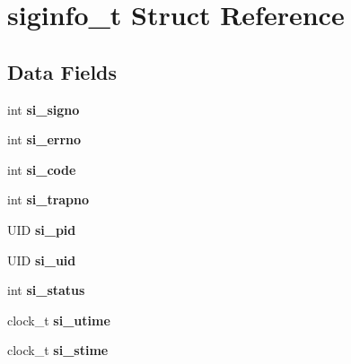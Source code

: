 \hypertarget{structsiginfo__t}{}\section{siginfo\+\_\+t Struct Reference}
\label{structsiginfo__t}
\subsection*{Data Fields}
\begin{DoxyCompactItemize}
\item 
int {\bfseries si\+\_\+signo}\hypertarget{structsiginfo__t_a238821f6eb15317d3d7b10efef80b9c7}{}\label{structsiginfo__t_a238821f6eb15317d3d7b10efef80b9c7}

\item 
int {\bfseries si\+\_\+errno}\hypertarget{structsiginfo__t_ae840a8f2824bab1693577f19f4d0432d}{}\label{structsiginfo__t_ae840a8f2824bab1693577f19f4d0432d}

\item 
int {\bfseries si\+\_\+code}\hypertarget{structsiginfo__t_a0dd36ae3e9df589f5755f88c93671c2d}{}\label{structsiginfo__t_a0dd36ae3e9df589f5755f88c93671c2d}

\item 
int {\bfseries si\+\_\+trapno}\hypertarget{structsiginfo__t_af0d5786bd101f043f25b9429ec9c6697}{}\label{structsiginfo__t_af0d5786bd101f043f25b9429ec9c6697}

\item 
U\+ID {\bfseries si\+\_\+pid}\hypertarget{structsiginfo__t_a7e339431258112cd65524fd9a06452ce}{}\label{structsiginfo__t_a7e339431258112cd65524fd9a06452ce}

\item 
U\+ID {\bfseries si\+\_\+uid}\hypertarget{structsiginfo__t_a77912449c51b6cf0edd7f0b3469e3c78}{}\label{structsiginfo__t_a77912449c51b6cf0edd7f0b3469e3c78}

\item 
int {\bfseries si\+\_\+status}\hypertarget{structsiginfo__t_accaf16ba75f1d4efd2e76f1991dc2b56}{}\label{structsiginfo__t_accaf16ba75f1d4efd2e76f1991dc2b56}

\item 
clock\+\_\+t {\bfseries si\+\_\+utime}\hypertarget{structsiginfo__t_af9581561c01b292a5b6e8191de4f5a2d}{}\label{structsiginfo__t_af9581561c01b292a5b6e8191de4f5a2d}

\item 
clock\+\_\+t {\bfseries si\+\_\+stime}\hypertarget{structsiginfo__t_aa8ca20ae65cdf4cbbb3f16ca05f793cd}{}\label{structsiginfo__t_aa8ca20ae65cdf4cbbb3f16ca05f793cd}


\end{DoxyCompactItemize}
